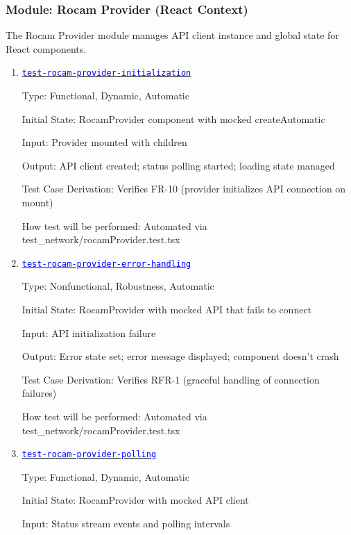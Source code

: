 \documentclass[12pt, titlepage]{article}
\newcommand{\tid}[1]{\hyperlink{tid:#1}{\textcolor{blue}{\texttt{#1}}}}
\begin{document}
\subsubsection{Module: Rocam Provider (React Context)}

The Rocam Provider module manages API client instance and global state for
React components.

\begin{enumerate}

  \item{\tid{test-rocam-provider-initialization}\\}

        Type: Functional, Dynamic, Automatic

        Initial State: RocamProvider component with mocked createAutomatic

        Input: Provider mounted with children

        Output: API client created; status polling started; loading state managed

        Test Case Derivation: Verifies FR-10 (provider initializes API connection on
        mount)

        How test will be performed: Automated via test\_network/rocamProvider.test.tsx

  \item{\tid{test-rocam-provider-error-handling}\\}

        Type: Nonfunctional, Robustness, Automatic

        Initial State: RocamProvider with mocked API that fails to connect

        Input: API initialization failure

        Output: Error state set; error message displayed; component doesn't crash

        Test Case Derivation: Verifies RFR-1 (graceful handling of connection failures)

        How test will be performed: Automated via test\_network/rocamProvider.test.tsx

  \item{\tid{test-rocam-provider-polling}\\}

        Type: Functional, Dynamic, Automatic

        Initial State: RocamProvider with mocked API client

        Input: Status stream events and polling intervals


\end{enumerate}
\end{document}
